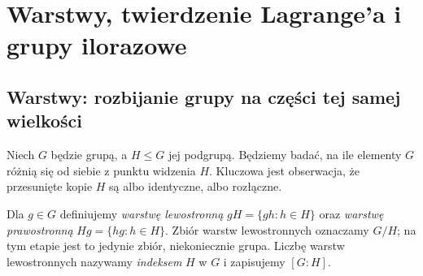 \chapter{Warstwy, twierdzenie Lagrange'a i grupy ilorazowe}
\label{aa:ch:lagrange-ilorazy}

\providecommand{\atlasref}[2]{#2}


\section{Warstwy: rozbijanie grupy na części tej samej wielkości}
Niech $G$ będzie grupą, a $H\le G$ jej podgrupą.
Będziemy badać, na ile elementy $G$ różnią się od siebie
z punktu widzenia $H$. Kluczowa jest obserwacja, że przesunięte
kopie $H$ są albo identyczne, albo rozłączne.

\begin{definicja}
\label{aa:def:warstwy}
Dla $g\in G$ definiujemy \emph{warstwę lewostronną}
$gH=\{gh:h\in H\}$ oraz \emph{warstwę prawostronną}
$Hg=\{hg:h\in H\}$.
Zbiór warstw lewostronnych oznaczamy $G/H$;
na tym etapie jest to jedynie zbiór, niekoniecznie grupa.
Liczbę warstw lewostronnych nazywamy \emph{indeksem} $H$ w $G$
i zapisujemy $[G:H]$.
\end{definicja}

